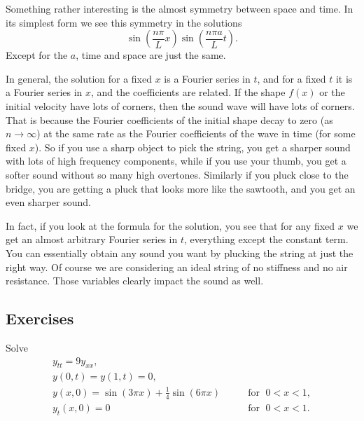 \pagebreak[2]
Something rather interesting is the almost symmetry between space and time.
In its simplest form we see this symmetry in the solutions
\begin{equation*}
\sin \left( \frac{n \pi}{L} x \right)
\sin \left( \frac{n \pi a}{L} t \right)  .
\end{equation*}
Except for the $a$, time and space are just the same.

In general, the solution for a fixed $x$ is a Fourier series in $t$, and for
a fixed $t$ it is a Fourier series in $x$, and the coefficients are related.
If the shape $f(x)$ or the initial velocity have lots of corners, then
the sound wave will have lots of corners.  That is because the Fourier coefficients
of the initial shape decay to zero (as $n \to \infty$) at the same rate as the Fourier coefficients
of the wave in time (for some fixed $x$).  So if you use a sharp object to
pick the string, you get a sharper sound with lots of high frequency
components, while if you use your thumb, you get a softer sound without
so many high overtones.  Similarly if you pluck close to the bridge, you are
getting a pluck that looks more like the sawtooth, and you get an even
sharper sound.

In fact, if you look at the formula for the solution, you see that for any
fixed $x$ we get an almost arbitrary Fourier series in $t$, everything
except the constant term.  You can essentially obtain any sound you want
by plucking the string at just the right way.
Of course we are considering an ideal string of no stiffness and no air
resistance.  Those variables clearly impact the sound as well.

\subsection{Exercises}

\begin{exercise}
Solve
\begin{equation*}
\begin{array}{ll}
y_{tt} = 9 y_{xx} , &  \\
y(0,t) = y(1,t) = 0 , &  \\
y(x,0) = \sin (3\pi x) + \frac{1}{4} \sin (6 \pi x) & \qquad \text{for } \; 0 < x < 1 , \\
y_t(x,0) = 0 & \qquad \text{for } \; 0 < x < 1 .
\end{array}
\end{equation*}
\end{exercise}

